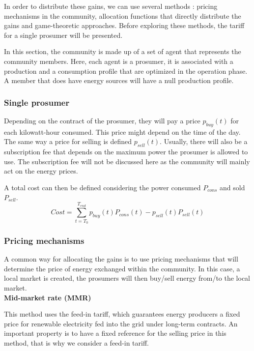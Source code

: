 In order to distribute these gains, we can use several methods : pricing mechanisms in the community, allocation functions that directly distribute the gains and game-theoretic approaches. Before exploring these methods, the tariff for a single prosumer will be presented.

In this section, the community is made up of a set of agent that represents the community members. Here, each agent is a prosumer, it is associated with a production and a consumption profile that are optimized in the operation phase. A member that does have energy sources will have a null production profile.


\subsubsection{Single prosumer}

Depending on the contract of the prosumer, they will pay a price $p_{buy}(t)$ for each kilowatt-hour consumed. This price might depend on the time of the day. The same way a price for selling is defined $p_{sell}(t)$. Usually, there will also be a subscription fee that depends on the maximum power the prosumer is allowed to use. The subscription fee will not be discussed here as the community will mainly act on the energy prices.

A total cost can then be defined considering the power consumed $P_{cons}$ and sold $P_{sell}$.
\begin{equation}
    Cost = \sum_{t=T_0}^{T_{end}} p_{buy}(t)P_{cons}(t) - p_{sell}(t)P_{sell}(t)
\end{equation}

\subsubsection{Pricing mechanisms}

A common way for allocating the gains is to use pricing mechanisms that will determine the price of energy exchanged within the community. In this case, a local market is created, the prosumers will then buy/sell energy from/to the local market.
\\

\noindent\textbf{Mid-market rate (MMR)}

This method uses the feed-in tariff, which guarantees energy producers a fixed price for renewable electricity fed into the grid under long-term contracts. An important property is to have a fixed reference for the selling price in this method, that is why we consider a feed-in tariff.

